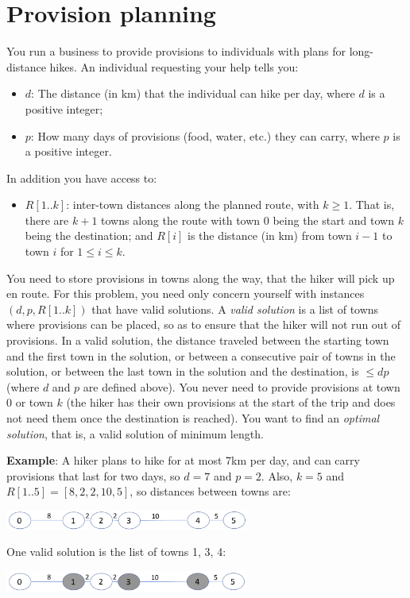 \documentclass[11pt,fleqn]{exam}
\begin{document}
\section{Provision planning}
You run a business to provide provisions to individuals with plans
for long-distance hikes. An individual requesting your help tells you:
\begin{itemize}
\item
$d$: The distance (in km) that the individual can hike per day, where $d$ is a positive integer;
\item
$p$: How many days of provisions (food, water, etc.) they can carry, where $p$ is a positive integer.
\end{itemize}
In addition you have access to:
\begin{itemize}
\item
$R[1..k]$: inter-town distances along the planned route, with $k \ge 1$. That is,
there are $k+1$ towns along the route with town 0 being the start and
town $k$ being the destination; and $R[i]$ is the distance (in km)
from town $i-1$ to town $i$ for $1\le i \le k$.
\end{itemize}
You need to store provisions in towns along the way,
that the hiker will pick up en route.  For this problem, you
need only concern yourself with instances $(d,p,R[1..k])$ that have
valid solutions. A
{\em valid solution} is a list of towns where provisions can
be placed, so as to ensure that the hiker will not run out of
provisions. In a valid solution, the distance traveled between the starting town
and the first town in the solution, or between a consecutive pair of
towns in the solution, or between the last town in the solution and
the destination, is $\le dp$ (where $d$ and $p$ are defined above).
You never need to provide provisions at town 0 or town $k$ (the hiker
has their own provisions at the start of the trip and does not need
them once the destination is reached).  You want to find an {\em
  optimal solution}, that is, a valid solution of minimum length.

\vspace{.1in}
\noindent
{\bf Example}: A hiker plans to
hike for at most 7km per day, and can carry provisions that
last for two days, so $d=7$ and $p=2$.
Also, $k=5$ and $R[1..5] = [8,2,2,10,5]$, so distances between towns are:

\begin{center}
\includegraphics[width=0.6\textwidth]{greedy-example1.png}
\end{center}
One valid solution is the list of towns 1, 3, 4:
\begin{center}
\includegraphics[width=0.6\textwidth]{greedy-example1b.png}
\end{center}
\end{document}
